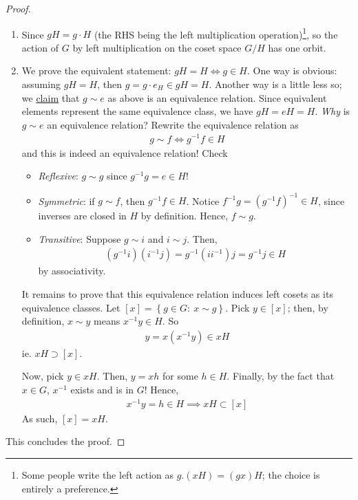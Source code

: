 \documentclass[11pt]{amsart} %
\theoremstyle{definition}
\theoremstyle{definition}
\numberwithin{equation}{section}
\newcommand{\condset}[4]{\left\{ #1  : \: #2 #3 #4 \right\}}
\begin{document}
\begin{proof}
	\begin{enumerate}
		\item Since $gH = g \cdot H$ (the RHS being the left multiplication operation)\footnote{Some people write the left action as $g.(xH) = (gx)H$; the choice is entirely a preference.}, so the action of $G$ by left multiplication on the coset space $G/H$ has one orbit.
		
		\item We prove the equivalent statement: $gH=H \iff g \in H$. One way is obvious: assuming $gH=H$, then $g=g \cdot e_H \in gH = H$. Another way is a little less so; we \uline{claim} that $g \sim e$ as above is an equivalence relation. Since equivalent elements represent the same equivalence class, we have $gH = eH = H$. \textit{Why} is $g \sim e$ an equivalence relation? Rewrite the equivalence relation as
		\begin{align*}
		g \sim f \iff g^{-1} f \in H
		\end{align*}
		and this is indeed an equivalence relation! Check
		\begin{itemize}
			\item \textit{Reflexive}: $g \sim g$ since $g^{-1} g = e \in H$!
			\item \textit{Symmetric}: if $g \sim f$, then $g^{-1} f \in H$. Notice $f^{-1} g =( g^{-1} f )^{-1} \in H$, since inverses are closed in $H$ by definition. Hence, $f \sim g$.
			\item \textit{Transitive}: Suppose $g \sim i$ and $i \sim j$. Then,
			\begin{align*}
			(g^{-1} i ) (i^{-1} j ) = g^{-1} (i i^{-1}) j  = g^{-1} j \in H
			\end{align*} 
			by associativity.
		\end{itemize}
		It remains to prove that this equivalence relation induces left cosets as its equivalence classes. Let $[x] = \condset{g \in G}{x}{\sim}{g}$. Pick $y \in [x]$; then, by definition, $x \sim y $ means $x^{-1} y \in H$. So
		\begin{align*}
			y = x(x^{-1} y) \in xH
		\end{align*}
		ie. $xH \supset [x]$.
		
		Now, pick $y \in xH$. Then, $y=xh$ for some $h \in H$. Finally, by the fact that $x \in G$, $x^{-1}$ exists and is in $G$! Hence,
		\begin{align*}
		x^{-1} y = h \in H \implies xH \subset [x]
		\end{align*}
		As such, $[x] = xH$.
	\end{enumerate}
This concludes the proof.
\end{proof}
\end{document}
